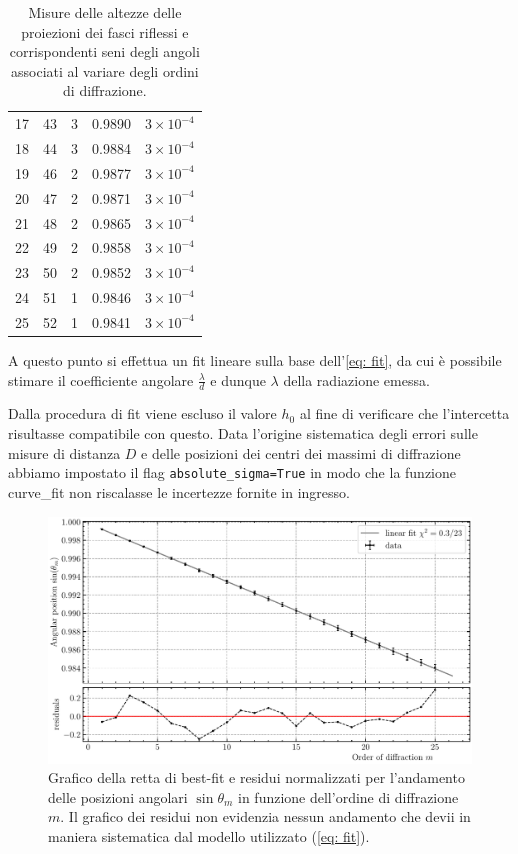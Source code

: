 \documentclass[10pt, a4paper, italian]{article}
\begin{document}
\begin{table}[htbp]
\begin{tabular}{ccccc}
17 & 43 & 3 & 0.9890 & $3 \times 10^{-4}$ \\
18 & 44 & 3 & 0.9884 & $3 \times 10^{-4}$ \\
19 & 46 & 2 & 0.9877 & $3 \times 10^{-4}$ \\
20 & 47 & 2 & 0.9871 & $3 \times 10^{-4}$ \\
21 & 48 & 2 & 0.9865 & $3 \times 10^{-4}$ \\
22 & 49 & 2 & 0.9858 & $3 \times 10^{-4}$ \\
23 & 50 & 2 & 0.9852 & $3 \times 10^{-4}$ \\
24 & 51 & 1 & 0.9846 & $3 \times 10^{-4}$ \\
25 & 52 & 1 & 0.9841 & $3 \times 10^{-4}$ \\
\bottomrule
\end{tabular}
\caption{Misure delle altezze delle proiezioni dei fasci riflessi e
corrispondenti seni degli angoli associati al variare degli ordini di
diffrazione. \label{tab: hm}}
\end{table}

A questo punto si effettua un fit lineare sulla base dell'\cref{eq: fit},
da cui è possibile stimare il coefficiente angolare $\frac{\lambda}{d}$ e
dunque $\lambda$ della radiazione emessa.

Dalla procedura di fit viene escluso il valore $h_0$ al fine di verificare che
l'intercetta risultasse compatibile con questo.
Data l'origine sistematica degli errori sulle misure di distanza $D$ e delle
posizioni dei centri dei massimi di diffrazione abbiamo impostato il flag
\verb+absolute_sigma=True+ in modo che la funzione curve\_fit non riscalasse
le incertezze fornite in ingresso.

\begin{figure}
\includegraphics[width=\textwidth]{thetafit}
\caption{Grafico della retta di best-fit e residui normalizzati per
l'andamento delle posizioni angolari $\sin{\theta_m}$ in funzione dell'ordine
di diffrazione $m$. Il grafico dei residui non evidenzia nessun andamento
che devii in maniera sistematica dal modello utilizzato (\cref{eq: fit}).
\label{fig: linfit}}
\end{figure}
\end{document}
